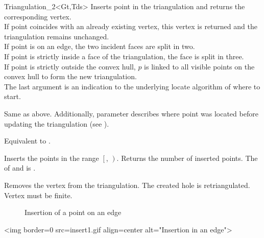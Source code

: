 \begin{ccClassTemplate}{Triangulation_2<Gt,Tds>}
{Inserts point  in the triangulation and returns the corresponding
 vertex.\\
If point  coincides with an already existing vertex, this 
vertex is returned and the triangulation remains unchanged.\\
If point  is on an edge, the two incident faces are split 
in two.\\
If point  is strictly inside a face of the triangulation,
the face is split in three.\\
If point  is strictly outside the  convex hull, $p$ is linked
to all visible points on the convex hull to form the new triangulation.\\
The last argument  is an indication to the underlying locate
algorithm of where to start.
}


{Same as above. Additionally, parameter  describes where point 
  was located before updating the triangulation 
 (see ).}

{Equivalent to .}

{Inserts the points in the range
 $\left[\right.$, $\left.\right)$.
 Returns the number of inserted points.
 \ccPrecond The  of  and 
 is .}

{Removes the vertex from the triangulation. The created hole is 
 retriangulated.
 \ccPrecond Vertex  must be finite.}


\begin{ccTexOnly}
  \begin{figure}
    \begin{center}
     
    \end{center}
    \caption{Insertion of a point on an edge}
    \label{I1_Fig_inser1t}
  \end{figure}
\end{ccTexOnly}

\begin{ccHtmlOnly}
<img border=0 src=insert1.gif align=center alt="Insertion in an edge">
\end{ccHtmlOnly}





\end{ccClassTemplate}
